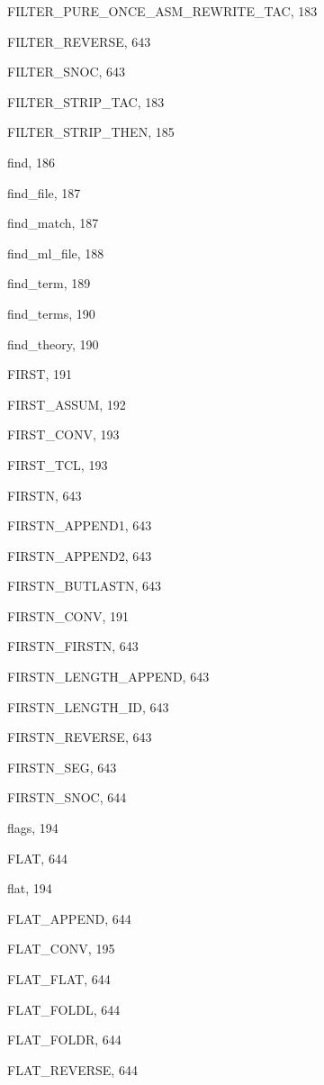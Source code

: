 \begin{theindex}
  \item {\ptt FILTER\_PURE\_ONCE\_ASM\_REWRITE\_TAC}, 183
  \item {\ptt FILTER\_REVERSE}, 643
  \item {\ptt FILTER\_SNOC}, 643
  \item {\ptt FILTER\_STRIP\_TAC}, 183
  \item {\ptt FILTER\_STRIP\_THEN}, 185
  \item {\ptt find}, 186
  \item {\ptt find\_file}, 187
  \item {\ptt find\_match}, 187
  \item {\ptt find\_ml\_file}, 188
  \item {\ptt find\_term}, 189
  \item {\ptt find\_terms}, 190
  \item {\ptt find\_theory}, 190
  \item {\ptt FIRST}, 191
  \item {\ptt FIRST\_ASSUM}, 192
  \item {\ptt FIRST\_CONV}, 193
  \item {\ptt FIRST\_TCL}, 193
  \item {\ptt FIRSTN}, 643
  \item {\ptt FIRSTN\_APPEND1}, 643
  \item {\ptt FIRSTN\_APPEND2}, 643
  \item {\ptt FIRSTN\_BUTLASTN}, 643
  \item {\ptt FIRSTN\_CONV}, 191
  \item {\ptt FIRSTN\_FIRSTN}, 643
  \item {\ptt FIRSTN\_LENGTH\_APPEND}, 643
  \item {\ptt FIRSTN\_LENGTH\_ID}, 643
  \item {\ptt FIRSTN\_REVERSE}, 643
  \item {\ptt FIRSTN\_SEG}, 643
  \item {\ptt FIRSTN\_SNOC}, 644
  \item {\ptt flags}, 194
  \item {\ptt FLAT}, 644
  \item {\ptt flat}, 194
  \item {\ptt FLAT\_APPEND}, 644
  \item {\ptt FLAT\_CONV}, 195
  \item {\ptt FLAT\_FLAT}, 644
  \item {\ptt FLAT\_FOLDL}, 644
  \item {\ptt FLAT\_FOLDR}, 644
  \item {\ptt FLAT\_REVERSE}, 644

\end{theindex}
